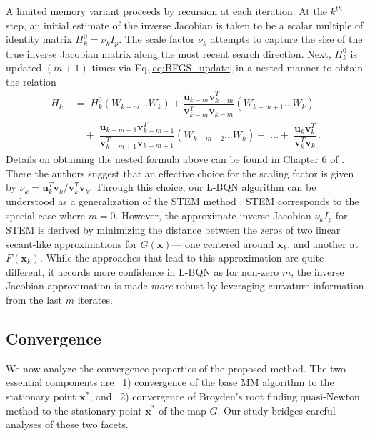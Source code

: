 \documentclass{statsoc}
\newcommand{\bu}{\boldsymbol{u}}
\newcommand{\bv}{\boldsymbol{v}}
\newcommand{\bx}{\boldsymbol{x}}
\begin{document}
A limited memory variant proceeds by recursion  at each iteration. At the  $k^{th}$ step, an initial estimate of the inverse Jacobian is taken to be a scalar multiple of identity matrix  $H_k^0= \nu_kI_p$. The scale factor $\nu_k$  attempts to capture the size of the true inverse Jacobian matrix along the most recent search direction. %
Next,  $H_k^0$ is updated $(m+1)$ times via Eq.\eqref{eq:BFGS_update} in a nested manner to obtain the relation
\begin{align*}
    H_{k} \; &= \; H_k^0 (W_{k-m} \ldots W_{k}) + \dfrac{\bu_{k-m} \bv_{k-m}^T}{\bv_{k-m}^T \bv_{k-m}}(W_{k-m+1} \ldots W_{k})\\
            \; & \quad + \; \dfrac{\bu_{k-m+1} \bv_{k-m+1}^T}{\bv_{k-m+1}^T \bv_{k-m+1}} (W_{k-m+2} \ldots W_{k}) + \; \ldots
            + \; \dfrac{\bu_{k} \bv_{k}^T}{\bv_{k}^T \bv_{k }}\,.
\end{align*}
Details on obtaining the nested formula above can be found in Chapter 6 of \cite{nocedal2006numerical}. There the authors suggest that an effective choice for the scaling factor is given by $ \nu_k = {\bu_{k}^T \bv_{k}}/{\bv_{k}^T \bv_{k}}.$
Through this choice, our L-BQN algorithm can be understood as a generalization of the STEM method \citep{varadhan2008simple}: STEM corresponds to the special case where $m=0$. However,  the approximate inverse Jacobian  $\nu_k I_p$ for STEM is derived by minimizing the distance between the zeros of two linear secant-like approximations for $G(\bx)$--- one centered around $\bx_k$, and another at $F(\bx_k)$. While the approaches that lead to this approximation are quite different, it accords more confidence in L-BQN as for non-zero $m$, the inverse Jacobian approximation is made \textit{more} robust by leveraging curvature information from the last $m$ iterates. %



\subsection{Convergence}
We now analyze the convergence properties of the proposed method.
The two essential components %
are \, 1) convergence of the base MM algorithm to the stationary point $\bx^\ast$, and \, 2) convergence of Broyden's root finding quasi-Newton method to the stationary point $\bx^\ast$ of the map $G$. Our study bridges careful analyses of these two facets. %
\end{document}
